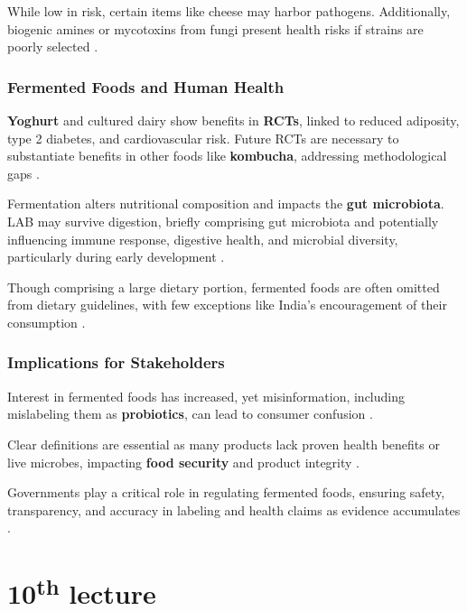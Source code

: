 While low in risk, certain items like cheese may harbor pathogens. Additionally, biogenic amines or mycotoxins from fungi present health risks if strains are poorly selected \cite*{L9-ISAPP}.

\subsubsection{Fermented Foods and Human Health}
\textbf{Yoghurt} and cultured dairy show benefits in \textbf{RCTs}, linked to reduced adiposity, type 2 diabetes, and cardiovascular risk. Future RCTs are necessary to substantiate benefits in other foods like \textbf{kombucha}, addressing methodological gaps \cite*{L9-ISAPP}.

Fermentation alters nutritional composition and impacts the \textbf{gut microbiota}. LAB may survive digestion, briefly comprising gut microbiota and potentially influencing immune response, digestive health, and microbial diversity, particularly during early development \cite*{L9-ISAPP}.

Though comprising a large dietary portion, fermented foods are often omitted from dietary guidelines, with few exceptions like India’s encouragement of their consumption \cite*{L9-ISAPP}.

\subsubsection{Implications for Stakeholders}
Interest in fermented foods has increased, yet misinformation, including mislabeling them as \textbf{probiotics}, can lead to consumer confusion \cite*{L9-ISAPP}.

Clear definitions are essential as many products lack proven health benefits or live microbes, impacting \textbf{food security} and product integrity \cite*{L9-ISAPP}.

Governments play a critical role in regulating fermented foods, ensuring safety, transparency, and accuracy in labeling and health claims as evidence accumulates \cite*{L9-ISAPP}.

\section{10\texorpdfstring{\textsuperscript{th}}{th} lecture}

